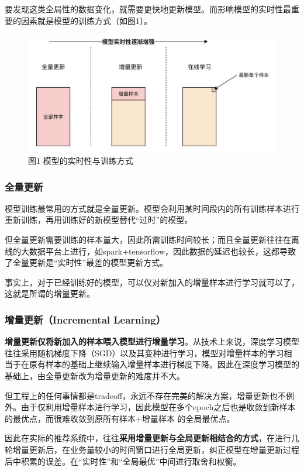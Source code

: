 \documentclass[12pt]{article}
\begin{document}
要发现这类全局性的数据变化，就需要更快地更新模型。而影响模型的实时性最重要的因素就是模型的训练方式（如图1）。
\begin{figure}[H]
    \centering
    \includegraphics[width=.8\textwidth]{fig/Model_Time_Delay_And_Training_Method.png}
    \caption*{图1 模型的实时性与训练方式}
\end{figure}

\subsubsection{全量更新}
模型训练最常用的方式就是全量更新。模型会利用某时间段内的所有训练样本进行重新训练，再用训练好的新模型替代“过时”的模型。

但全量更新需要训练的样本量大，因此所需训练时间较长；而且全量更新往往在离线的大数据平台上进行，如spark+tensorflow，因此数据的延迟也较长，这都导致了全量更新是“实时性”最差的模型更新方式。

事实上，对于已经训练好的模型，可以仅对新加入的增量样本进行学习就可以了，这就是所谓的增量更新。

\subsubsection{增量更新（Incremental Learning）}
\textbf{增量更新仅将新加入的样本喂入模型进行增量学习}。从技术上来说，深度学习模型往往采用随机梯度下降（SGD）以及其变种进行学习，模型对增量样本的学习相当于在原有样本的基础上继续输入增量样本进行梯度下降。因此在深度学习模型的基础上，由全量更新改为增量更新的难度并不大。

但工程上的任何事情都是tradeoff，永远不存在完美的解决方案，增量更新也不例外。由于仅利用增量样本进行学习，因此模型在多个epoch之后也是收敛到新样本的最优点，而很难收敛到原所有样本+增量样本 的全局最优点。

因此在实际的推荐系统中，往往\textbf{采用增量更新与全局更新相结合的方式}，在进行几轮增量更新后，在业务量较小的时间窗口进行全局更新，纠正模型在增量更新过程后中积累的误差。在“实时性”和“全局最优”中间进行取舍和权衡。
\end{document}

